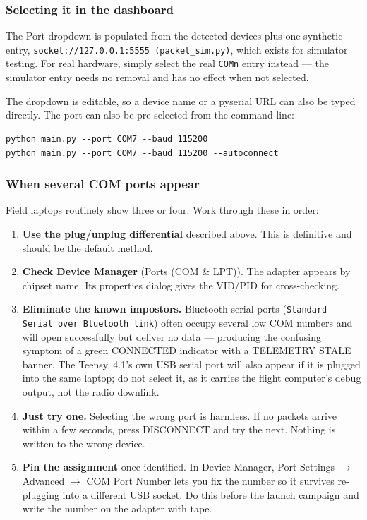 \documentclass[11pt,a4paper]{article}
\newcommand{\code}[1]{\texttt{#1}}
\begin{document}
\subsubsection{Selecting it in the dashboard}

The \textsf{Port} dropdown is populated from the detected devices plus one
synthetic entry, \code{socket://127.0.0.1:5555 (packet\_sim.py)}, which
exists for simulator testing. For real hardware, simply select the real
\code{COMn} entry instead --- the simulator entry needs no removal and has no
effect when not selected.

The dropdown is editable, so a device name or a pyserial URL can also be
typed directly. The port can also be pre-selected from the command line:

\begin{lstlisting}[style=gcsshell,caption={Pre-selecting a port at launch.}]
python main.py --port COM7 --baud 115200
python main.py --port COM7 --baud 115200 --autoconnect
\end{lstlisting}

\subsubsection{When several COM ports appear}

Field laptops routinely show three or four. Work through these in order:

\begin{enumerate}
  \item \textbf{Use the plug/unplug differential} described above. This is
        definitive and should be the default method.
  \item \textbf{Check Device Manager} (\textsf{Ports (COM \& LPT)}). The
        adapter appears by chipset name. Its properties dialog gives the
        VID/PID for cross-checking.
  \item \textbf{Eliminate the known impostors.} Bluetooth serial ports
        (\code{Standard Serial over Bluetooth link}) often occupy several
        low COM numbers and will open successfully but deliver no data ---
        producing the confusing symptom of a green \textsf{CONNECTED}
        indicator with a \textsf{TELEMETRY STALE} banner. The Teensy~4.1's
        own USB serial port will also appear if it is plugged into the same
        laptop; do not select it, as it carries the flight computer's debug
        output, not the radio downlink.
  \item \textbf{Just try one.} Selecting the wrong port is harmless. If no
        packets arrive within a few seconds, press \textsf{DISCONNECT} and
        try the next. Nothing is written to the wrong device.
  \item \textbf{Pin the assignment} once identified. In Device Manager,
        \textsf{Port Settings} $\rightarrow$ \textsf{Advanced} $\rightarrow$
        \textsf{COM Port Number} lets you fix the number so it survives
        re-plugging into a different USB socket. Do this before the launch
        campaign and write the number on the adapter with tape.
\end{enumerate}
\end{document}
